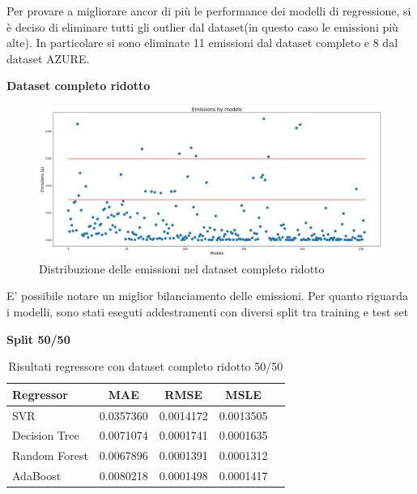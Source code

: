 Per provare a migliorare ancor di più le performance dei modelli di regressione, si è deciso di eliminare tutti gli outlier dal dataset(in questo caso le emissioni più alte). In particolare si sono eliminate 11 emissioni dal dataset completo e 8 dal dataset AZURE.

\noindent \textbf{Dataset completo ridotto}



\begin{figure}[H]
    \centering
    \includegraphics[scale=0.25]{images/nuova-situazione-ridotto.png}
    \caption{Distribuzione delle emissioni nel dataset completo ridotto}
\end{figure}

\noindent E' possibile notare un miglior bilanciamento delle emissioni. Per quanto riguarda i modelli, sono stati eseguti addestramenti con diversi split tra training e test set

\noindent\textbf{Split 50/50}


\begin{table}[H]
    \centering
    \begin{tabular}{|>{\centering\arraybackslash}m{5cm}|c|c|c|c|}
        \hline
        \textbf{Regressor} & \textbf{MAE} & \textbf{RMSE} & \textbf{MSLE} \\ [10pt]
        \hline
        SVR & 0.0357360 & 0.0014172 & 0.0013505 \\ [10pt]
        \hline
        Decision Tree & 0.0071074 & 0.0001741 & 0.0001635 \\ [10pt]
        \hline
        Random Forest & 0.0067896 & 0.0001391 & 0.0001312 \\ [10pt]
        \hline
        AdaBoost & 0.0080218 & 0.0001498 & 0.0001417 \\ [10pt]
        \hline
    \end{tabular}
    \caption{Risultati regressore con dataset completo ridotto 50/50}
    \label{tab:results}
\end{table}

